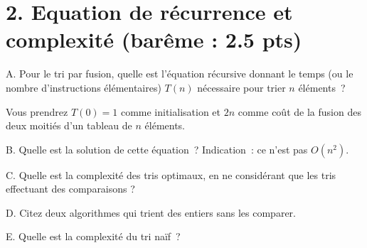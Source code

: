 \documentclass[11pt]{article}
\begin{document}
{
\section*{2. Equation de récurrence et complexité (barême : 2.5 pts)}
A. Pour le tri par fusion, quelle est l'équation récursive
donnant le temps  (ou  le nombre d'instructions élémentaires) $T(n)$ nécessaire pour trier $n$ éléments~? 


Vous prendrez $T(0)=1$ comme initialisation et $2n$ comme coût de la fusion des deux moitiés d'un tableau de $n$ éléments. 

\medskip
B. Quelle est la solution de cette équation~? Indication~: ce n'est pas $O( n^2)$.

\medskip
C. Quelle est la complexité des tris optimaux, en ne considérant que les tris effectuant des comparaisons ?

\medskip
D. Citez deux algorithmes qui trient des entiers sans les comparer.

\medskip
E. Quelle est la complexité du tri naïf~?
}
\end{document}
